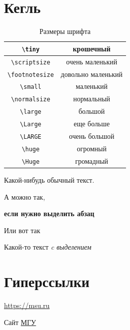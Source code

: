 \documentclass[a4paper, 12pt]{article}
\begin{document}
\section{Кегль}
    \begin{table}[h!]
        \caption{Размеры шрифта}
        \centering
        \begin{tabular}{|c|c|}
            \hline	\verb|\tiny|      & \tiny        крошечный \\
            \hline	\verb|\scriptsize|   & \scriptsize  очень маленький\\
            \hline \verb|\footnotesize| & \footnotesize  довольно маленький \\
            \hline \verb|\small|        &  \small        маленький \\
            \hline \verb|\normalsize|   &  \normalsize  нормальный \\
            \hline \verb|\large|        &  \large       большой \\
            \hline \verb|\Large|        &  \Large       еще больше \\[5pt]
            \hline \verb|\LARGE|        &  \LARGE       очень большой \\[5pt]
            \hline \verb|\huge|         &  \huge        огромный \\[5pt]
            \hline \verb|\Huge|         &  \Huge        громадный \\ \hline
        \end{tabular}
    \end{table}

Какой-\scriptsize нибудь \Large обычный \normalsize текст.

\begin{Huge}
    А можно так,
    
    \textbf{если нужно выделить абзац}
\end{Huge}

Или {\Large вот} так

Какой-то текст \emph{c выделением  }


\section{Гиперссылки}
\url{https://msu.ru}

Сайт \href{http://msu.ru}{МГУ}
\end{document}
